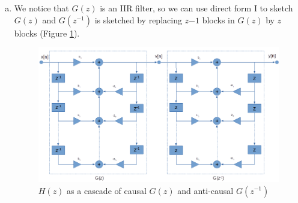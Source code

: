 \begin{enumerate}[(a)]
\item

We notice that $G(z)$ is an IIR filter, so we can use direct form I to sketch $G(z)$ and $G(z^{-1})$ is sketched by replacing $z{-1}$ blocks in $G(z)$ by $z$ blocks (Figure \ref{fig:p5d}).

\begin{figure}[htbp]
	\centering
	\includegraphics[width=\linewidth]{images/p5d}
	\caption{$H(z)$ as a cascade of causal $G(z)$ and anti-causal $G(z^{-1})$}
	\label{fig:p5d}
\end{figure}
\end{enumerate}